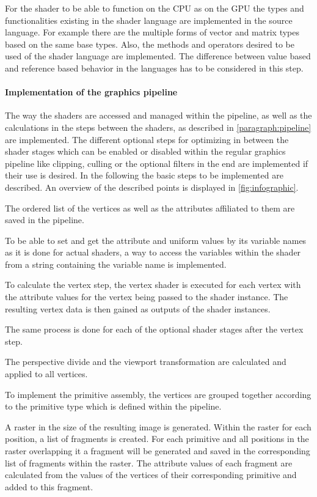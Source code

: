 For the shader to be able to function on the CPU as on the GPU the types and functionalities existing in the shader language are implemented in the source language. For example there are the multiple forms of vector and matrix types based on the same base types. Also, the methods and operators desired to be used of the shader language are implemented. The difference between value based and reference based behavior in the languages has to be considered in this step.

\paragraph{Implementation of the graphics pipeline}

The way the shaders are accessed and managed within the pipeline, as well as the calculations in the steps between the shaders, as described in \autoref{paragraph:pipeline} are implemented. The different optional steps for optimizing in between the shader stages which can be enabled or disabled within the regular graphics pipeline like clipping, culling or the optional filters in the end are implemented if their use is desired. In the following the basic steps to be implemented are described. An overview of the described points is displayed in \autoref{fig:infographic}.

The ordered list of the vertices as well as the attributes affiliated to them are saved in the pipeline.

To be able to set and get the attribute and uniform values by its variable names as it is done for actual shaders, a way to access the variables within the shader from a string containing the variable name is implemented.

To calculate the vertex step, the vertex shader is executed for each vertex with the attribute values for the vertex being passed to the shader instance. The resulting vertex data is then gained as outputs of the shader instances.

The same process is done for each of the optional shader stages after the vertex step.

The perspective divide and the viewport transformation are calculated and applied to all vertices.

To implement the primitive assembly, the vertices are grouped together according to the primitive type which is defined within the pipeline.

A raster in the size of the resulting image is generated. Within the raster for each position, a list of fragments is created. For each primitive and all positions in the raster overlapping it a fragment will be generated and saved in the corresponding list of fragments within the raster. The attribute values of each fragment are calculated from the values of the vertices of their corresponding primitive and added to this fragment.

